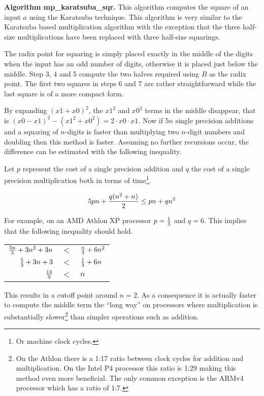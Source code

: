 \documentclass[b5paper]{book}
\begin{document}
\textbf{Algorithm mp\_karatsuba\_sqr.}
This algorithm computes the square of an input $a$ using the Karatsuba technique.  This algorithm is very similar to the Karatsuba based
multiplication algorithm with the exception that the three half-size multiplications have been replaced with three half-size squarings.

The radix point for squaring is simply placed exactly in the middle of the digits when the input has an odd number of digits, otherwise it is
placed just below the middle.  Step 3, 4 and 5 compute the two halves required using $B$
as the radix point.  The first two squares in steps 6 and 7 are rather straightforward while the last square is of a more compact form.

By expanding $\left (x1 + x0 \right )^2$, the $x1^2$ and $x0^2$ terms in the middle disappear, that is $(x0 - x1)^2 - (x1^2 + x0^2)  = 2 \cdot x0 \cdot x1$.
Now if $5n$ single precision additions and a squaring of $n$-digits is faster than multiplying two $n$-digit numbers and doubling then
this method is faster.  Assuming no further recursions occur, the difference can be estimated with the following inequality.

Let $p$ represent the cost of a single precision addition and $q$ the cost of a single precision multiplication both in terms of time\footnote{Or
machine clock cycles.}. 

\begin{equation}
5pn +{{q(n^2 + n)} \over 2} \le pn + qn^2
\end{equation}

For example, on an AMD Athlon XP processor $p = {1 \over 3}$ and $q = 6$.  This implies that the following inequality should hold.
\begin{center}
\begin{tabular}{rcl}
${5n \over 3} + 3n^2 + 3n$     & $<$ & ${n \over 3} + 6n^2$ \\
${5 \over 3} + 3n + 3$     & $<$ & ${1 \over 3} + 6n$ \\
${13 \over 9}$     & $<$ & $n$ \\
\end{tabular}
\end{center}

This results in a cutoff point around $n = 2$.  As a consequence it is actually faster to compute the middle term the ``long way'' on processors
where multiplication is substantially slower\footnote{On the Athlon there is a 1:17 ratio between clock cycles for addition and multiplication.  On
the Intel P4 processor this ratio is 1:29 making this method even more beneficial.  The only common exception is the ARMv4 processor which has a
ratio of 1:7.  } than simpler operations such as addition.  
\end{document}
